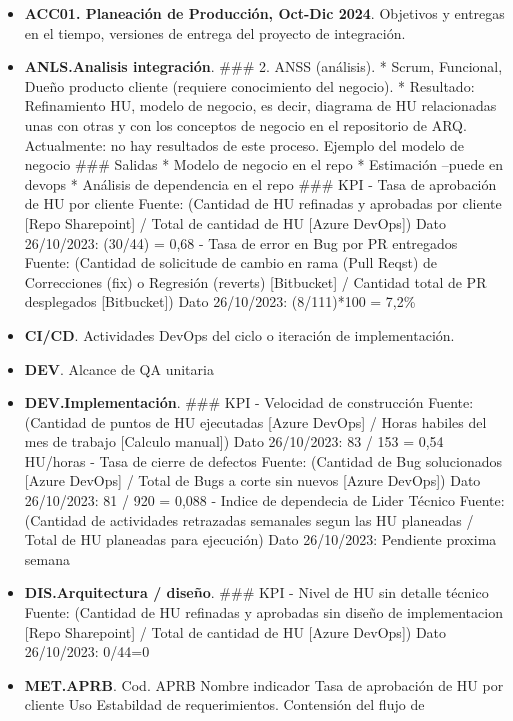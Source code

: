 \documentclass[
  paper=a4,
  ,captions=tableheading
]{scrartcl}
\providecommand{\tightlist}{%
  \setlength{\itemsep}{0pt}\setlength{\parskip}{0pt}}
\begin{document}
\begin{itemize}
\tightlist
\item
  \textbf{ACC01. Planeación de Producción, Oct-Dic 2024}. Objetivos y
  entregas en el tiempo, versiones de entrega del proyecto de
  integración.
\item
  \textbf{ANLS.Analisis integración}. \#\#\# 2. ANSS (análisis). *
  Scrum, Funcional, Dueño producto cliente (requiere conocimiento del
  negocio). * Resultado: Refinamiento HU, modelo de negocio, es decir,
  diagrama de HU relacionadas unas con otras y con los conceptos de
  negocio en el repositorio de ARQ. Actualmente: no hay resultados de
  este proceso. Ejemplo del modelo de negocio \#\#\# Salidas * Modelo de
  negocio en el repo * Estimación --puede en devops * Análisis de
  dependencia en el repo \#\#\# KPI - Tasa de aprobación de HU por
  cliente Fuente: (Cantidad de HU refinadas y aprobadas por cliente
  {[}Repo Sharepoint{]} / Total de cantidad de HU {[}Azure DevOps{]})
  Dato 26/10/2023: (30/44) = 0,68 - Tasa de error en Bug por PR
  entregados Fuente: (Cantidad de solicitude de cambio en rama (Pull
  Reqst) de Correcciones (fix) o Regresión (reverts) {[}Bitbucket{]} /
  Cantidad total de PR desplegados {[}Bitbucket{]}) Dato 26/10/2023:
  (8/111)*100 = 7,2\%
\item
  \textbf{CI/CD}. Actividades DevOps del ciclo o iteración de
  implementación.
\item
  \textbf{DEV}. Alcance de QA unitaria
\item
  \textbf{DEV.Implementación}. \#\#\# KPI - Velocidad de construcción
  Fuente: (Cantidad de puntos de HU ejecutadas {[}Azure DevOps{]} /
  Horas habiles del mes de trabajo {[}Calculo manual{]}) Dato
  26/10/2023: 83 / 153 = 0,54 HU/horas - Tasa de cierre de defectos
  Fuente: (Cantidad de Bug solucionados {[}Azure DevOps{]} / Total de
  Bugs a corte sin nuevos {[}Azure DevOps{]}) Dato 26/10/2023: 81 / 920
  = 0,088 - Indice de dependecia de Lider Técnico Fuente: (Cantidad de
  actividades retrazadas semanales segun las HU planeadas / Total de HU
  planeadas para ejecución) Dato 26/10/2023: Pendiente proxima semana
\item
  \textbf{DIS.Arquitectura / diseño}. \#\#\# KPI - Nivel de HU sin
  detalle técnico Fuente: (Cantidad de HU refinadas y aprobadas sin
  diseño de implementacion {[}Repo Sharepoint{]} / Total de cantidad de
  HU {[}Azure DevOps{]}) Dato 26/10/2023: 0/44=0
\item
  \textbf{MET.APRB}. Cod. APRB Nombre indicador Tasa de aprobación de HU
  por cliente Uso Estabildad de requerimientos. Contensión del flujo de

\end{itemize}
\end{document}
